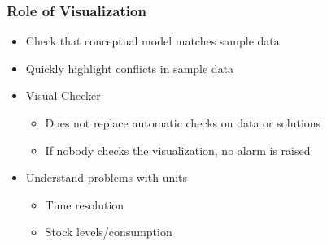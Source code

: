 \documentclass[dvipsnames,aspectratio=169]{beamer}
\begin{document}
%

%    



\begin{frame}
  \frametitle{Role of Visualization}
  \begin{itemize}
  \item Check that conceptual model matches sample data
  \item Quickly highlight conflicts in sample data
  \item Visual Checker
  \begin{itemize}
      \item Does not replace automatic checks on data or solutions
      \item If nobody checks the visualization, no alarm is raised
  \end{itemize}
    \item Understand problems with units
    \begin{itemize}
        \item Time resolution
        \item Stock levels/consumption
    \end{itemize}
  \end{itemize}
\end{frame}
\end{document}
